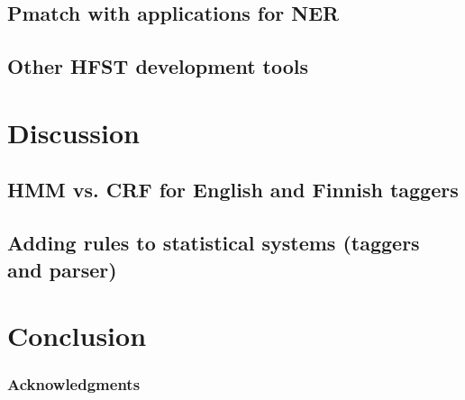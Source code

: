 \documentclass{llncs}
\begin{document}
\subsection{Pmatch with applications for NER}

\subsection{Other HFST development tools}

\section{Discussion}\label{hfst:discussion}

\subsection{HMM vs. CRF for English and Finnish taggers}

\subsection{Adding rules to statistical systems (taggers and parser)}

\section{Conclusion}\label{hfst:conclusion}

\subsubsection*{Acknowledgments}



\end{document}
